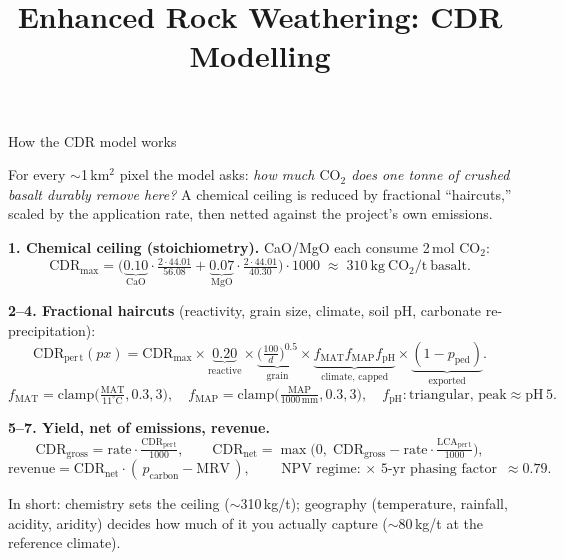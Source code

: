 \documentclass[aspectratio=169,10pt]{beamer}
\title{Enhanced Rock Weathering: CDR Modelling}
\date{}
\newcommand{\co}{\mathrm{CO_2}}
\begin{document}
\begin{frame}{How the CDR model works}

\small
For every $\sim$1\,km$^2$ pixel the model asks: \emph{how much $\co$ does one tonne of
crushed basalt durably remove here?} A chemical ceiling is reduced by fractional
``haircuts,'' scaled by the application rate, then netted against the project's own
emissions.

\medskip
\textbf{1. Chemical ceiling (stoichiometry).} CaO/MgO each consume 2\,mol $\co$:
\[
\mathrm{CDR_{max}} =
\Big(\underbrace{0.10}_{\mathrm{CaO}}\cdot\tfrac{2\cdot44.01}{56.08}
   + \underbrace{0.07}_{\mathrm{MgO}}\cdot\tfrac{2\cdot44.01}{40.30}\Big)\cdot 1000
\;\approx\; 310~\mathrm{kg~\co/t~basalt}.
\]

\textbf{2--4. Fractional haircuts} (reactivity, grain size, climate, soil pH, carbonate re-precipitation):
\[
\mathrm{CDR_{per\,t}}(px)=\mathrm{CDR_{max}}\times
\underbrace{0.20}_{\text{reactive}}\times
\underbrace{\big(\tfrac{100}{d}\big)^{0.5}}_{\text{grain}}\times
\underbrace{f_{\mathrm{MAT}}f_{\mathrm{MAP}}f_{\mathrm{pH}}}_{\text{climate, capped}}\times
\underbrace{(1-p_{\mathrm{ped}})}_{\text{exported}} .
\]
\[
f_{\mathrm{MAT}}=\mathrm{clamp}\!\big(\tfrac{\mathrm{MAT}}{11^\circ\mathrm C},0.3,3\big),\quad
f_{\mathrm{MAP}}=\mathrm{clamp}\!\big(\tfrac{\mathrm{MAP}}{1000\,\mathrm{mm}},0.3,3\big),\quad
f_{\mathrm{pH}}:\text{triangular, peak}\approx\mathrm{pH}\,5.
\]

\textbf{5--7. Yield, net of emissions, revenue.}
\[
\mathrm{CDR_{gross}}=\mathrm{rate}\cdot\tfrac{\mathrm{CDR_{per\,t}}}{1000},\qquad
\mathrm{CDR_{net}}=\max\!\big(0,\;\mathrm{CDR_{gross}}-\mathrm{rate}\cdot\tfrac{\mathrm{LCA_{per\,t}}}{1000}\big),
\]
\[
\mathrm{revenue}=\mathrm{CDR_{net}}\cdot(\,p_{\mathrm{carbon}}-\mathrm{MRV}\,),\qquad
\text{NPV regime: $\times$ 5-yr phasing factor }\approx 0.79 .
\]

\medskip
\footnotesize\textcolor{erwgreen}{In short: chemistry sets the ceiling ($\sim$310\,kg/t);
geography (temperature, rainfall, acidity, aridity) decides how much of it you actually
capture ($\sim$80\,kg/t at the reference climate).}

\end{frame}
\end{document}

